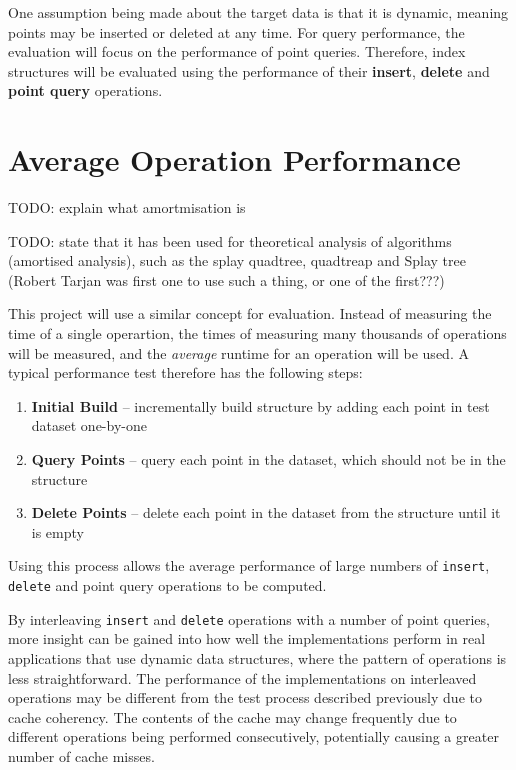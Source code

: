 One assumption being made about the target data is that it is dynamic, meaning points may be inserted or deleted at any time. For query performance, the evaluation will focus on the performance of point queries. Therefore, index structures will be evaluated using the performance of their \textbf{insert}, \textbf{delete} and \textbf{point query} operations.

\section{Average Operation Performance}

TODO: explain what amortmisation is

TODO: state that it has been used for theoretical analysis of algorithms (amortised analysis), such as the splay quadtree, quadtreap and Splay tree (Robert Tarjan was first one to use such a thing, or one of the first???)

This project will use a similar concept for evaluation. Instead of measuring the time of a single operartion, the times of measuring many thousands of operations will be measured, and the \textit{average} runtime for an operation will be used. A typical performance test therefore has the following steps:
\begin{enumerate}
	\item \textbf{Initial Build} -- incrementally build structure by adding each point in test dataset one-by-one
	\item \textbf{Query Points} -- query each point in the dataset, which should not be in the structure
	\item \textbf{Delete Points} -- delete each point in the dataset from the structure until it is empty
\end{enumerate}
Using this process allows the average performance of large numbers of \texttt{insert}, \texttt{delete} and point query operations to be computed. 

By interleaving \texttt{insert} and \texttt{delete} operations with a number of point queries, more insight can be gained into how well the implementations perform in real applications that use dynamic data structures, where the pattern of operations is less straightforward. The performance of the implementations on interleaved operations may be different from the test process described previously due to cache coherency. The contents of the cache may change frequently due to different operations being performed consecutively, potentially causing a greater number of cache misses.

